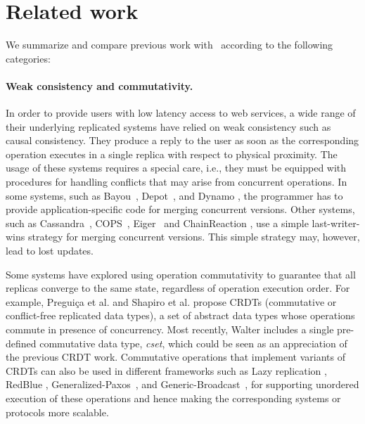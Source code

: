 \section{Related work}
\label{ch:sieve:sect:related}
We summarize and compare previous work with \tool\ according to the
following categories:

\noindent\paragraph{Weak consistency and commutativity.} 
In order to provide users with low latency access to web services,
a wide range of their underlying replicated systems have relied on weak
consistency such as causal consistency. They produce a reply to the user
 as soon as the corresponding operation executes in a single replica 
with respect to physical proximity. The usage of these systems requires
a special care, i.e., they must be equipped with procedures for handling 
conflicts that may arise from concurrent operations. In some
systems, such as Bayou~\cite{Terry1995Managing},
Depot~\cite{Mahajan2010Depot}, and Dynamo \cite{Decandia2007Dynamo},
the programmer has to provide application-specific code for merging 
concurrent versions. Other systems, such as Cassandra~\cite{Lakshman2010Cassandra},
COPS~\cite{Lloyd2011Causal}, Eiger~\cite{Lloyd2013Stronger} and
ChainReaction \cite{Almeida2013Chainreaction}, use a simple
last-writer-wins strategy for merging concurrent versions. This
simple strategy may, however, lead to lost updates.

Some systems have explored using operation
commutativity to guarantee that all replicas converge to the same
state, regardless of operation execution order. For example, 
Pregui{\c c}a et al. and Shapiro et al. propose CRDTs (commutative or conflict-free replicated data types), 
a set of abstract data types whose operations commute in presence of
concurrency\cite{Preguica2009CRDT,Shapiro2011Conflict}.
Most recently, Walter \cite{Sovran2011PSI} includes a single pre-defined commutative data type, 
\emph{cset}, which could be seen as an appreciation of the previous CRDT work. 
Commutative operations that implement variants of
CRDTs can also be used in different frameworks such as Lazy replication \cite{Ladin1992LazyReplication},
RedBlue \cite{Li2012RedBlue}, Generalized-Paxos~\cite{Lamport2005GeneralizedPaxos}, and Generic-Broadcast~\cite{Pedone99genericbroadcast}, 
for supporting unordered execution of these operations and hence making
the corresponding systems or protocols more scalable.

